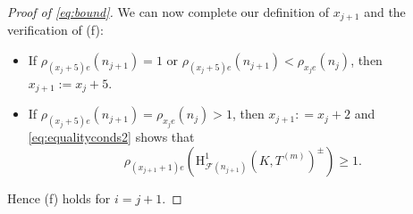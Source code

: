 \documentclass[a4paper,10pt]{amsart}
\numberwithin{equation}{section}
\numberwithin{equation}{section}
\theoremstyle{plain}
\theoremstyle{definition}
\theoremstyle{definition}
\theoremstyle{plain}
\theoremstyle{plain}
\theoremstyle{plain}
\theoremstyle{plain}
\newcommand{\F}{\mathcal{F}}
\newcommand{\rH}{\mathrm{H}}
\begin{document}
\begin{proof}[Proof of \eqref{eq:bound}]
%

We can now complete our definition of $x_{j+1}$ and the verification of (f):
\begin{itemize}
\item[(i)] If $\rho_{(x_j+5)e}(n_{j+1}) = 1$ or $\rho_{(x_j+5)e}(n_{j+1}) < \rho_{x_je}(n_j)$, then 
$x_{j+1}:= x_j+5$.
\item[(ii)] If $\rho_{(x_j+5)e}(n_{j+1}) = \rho_{x_je}(n_j)>1$, then $x_{j+1}: = x_j +2$ and 
\eqref{eq:equalityconds2} shows that 
$$\rho_{(x_{j+1}+1)e}(\rH^1_{\F(n_{j+1})}(K,T^{(m)})^{\pm}) \geq 1.$$
\end{itemize}
Hence (f) holds for $i=j+1$.



\end{proof}
\end{document}
